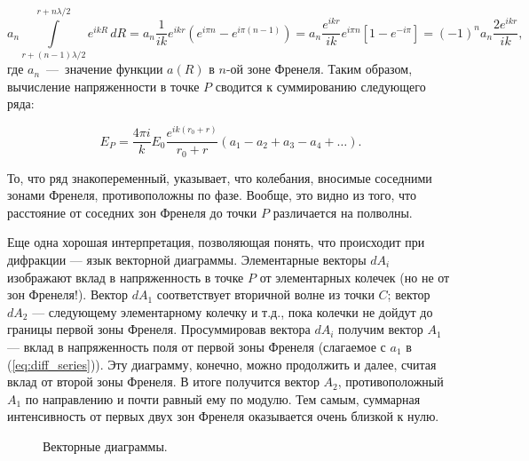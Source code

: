 \documentclass[12pt,a4paper]{article}
\numberwithin{equation}{section}
\numberwithin{equation}{section}
\begin{document}
\begin{equation}
  a_n \int\limits_{r + (n-1) \lambda /2}^{r + n \lambda /2} e^{i k R}\, dR = a_n \frac{1}{ik} e^{ikr} \left(e^{i \pi n} - e^{i \pi (n-1)} \right) = a_n \frac{e^{ikr}}{ik} e^{i \pi n} \left[1 - e^{-i \pi} \right] = (-1)^n a_n \frac{2e^{ikr}}{ik},
\end{equation}
где $a_n$~---~значение функции $a(R)$ в $n$-ой зоне Френеля. Таким
образом, вычисление напряженности в точке $P$ сводится к суммированию
следующего ряда:

\begin{equation} 
\label{eq:diff_series}
E_P = \frac{4 \pi i}{k} E_0 \frac{e^{ik (r_0 +r)}}{r_0 + r} (a_1 - a_2 + a_3 - a_4 + \ldots).
\end{equation}

То, что ряд знакопеременный, указывает, что колебания, вносимые
соседними зонами Френеля, противоположны по фазе. Вообще, это видно из
того, что расстояние от соседних зон Френеля до точки $P$ различается
на полволны.

Еще одна хорошая интерпретация, позволяющая понять, что происходит при
дифракции --- язык векторной диаграммы. Элементарные векторы $dA_i$
изображают вклад в напряженность в точке $P$ от элементарных колечек
(но не от зон Френеля!). Вектор $dA_1$ соответствует вторичной волне
из точки $C$; вектор $dA_2$ --- следующему элементарному колечку и
т.д., пока колечки не дойдут до границы первой зоны
Френеля. Просуммировав вектора $dA_i$ получим вектор $A_1$ --- вклад в
напряженность поля от первой зоны Френеля (слагаемое с $a_1$ в
(\ref{eq:diff_series})). Эту диаграмму, конечно, можно продолжить и
далее, считая вклад от второй зоны Френеля. В итоге получится вектор
$A_2$, противоположный $A_1$ по направлению и почти равный ему по
модулю. Тем самым, суммарная интенсивность от первых двух зон Френеля
оказывается очень близкой к нулю.

\begin{figure}[h]
  \centering
  \hspace{2cm}
  \caption{Векторные диаграммы.}
  \label{fig:vector_dia}
\end{figure}
\end{document}
